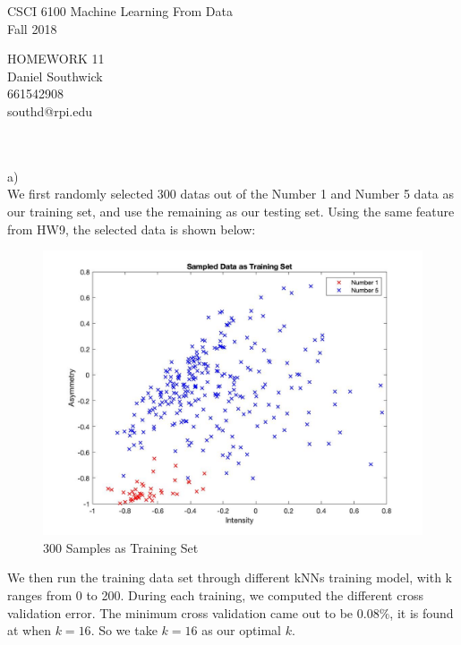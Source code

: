 \documentclass[12pt]{article}
\begin{document}
\begin{center}
CSCI 6100 Machine Learning From Data\\
Fall 2018\\
\end{center}
\begin{center}
HOMEWORK 11\\
Daniel Southwick\\
661542908\\
southd@rpi.edu
\end{center}
\vspace{.1in}

 \\\\
\noindent a)\\
\indent We first randomly selected 300 datas out of the Number 1 and Number 5 data as our training set, and use the remaining as our testing set. Using the same feature from HW9, the selected data is shown below:
\begin{figure}[H]
  \centering
  \includegraphics[scale = 0.27]{1.jpg}
  \caption{300 Samples as Training Set}
  \label{fig:1}
\end{figure}
\indent We then run the training data set through different kNNs training model, with k ranges from 0 to 200. During each training, we computed the different cross validation error. The minimum cross validation came out to be $0.08\%$, it is found at when $k = 16$. So we take $k = 16$ as our optimal $k$.
\end{document}
